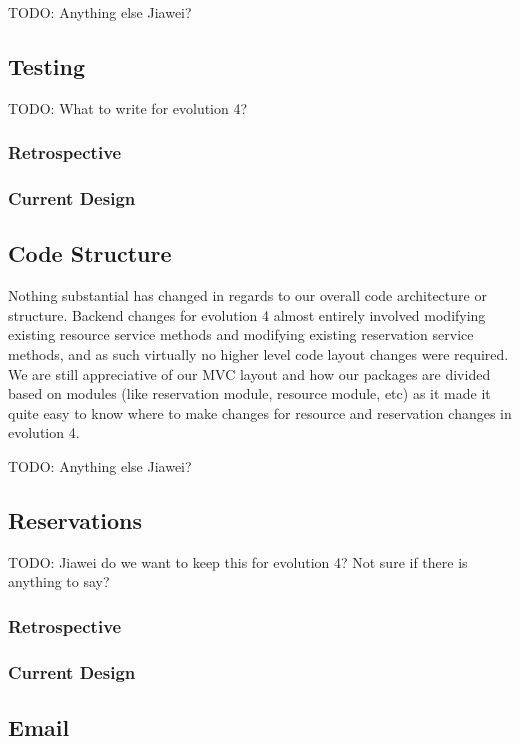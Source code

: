 \documentclass[12pt]{article}
\begin{document}
TODO: Anything else Jiawei? 


\subsection{Testing}

TODO: What to write for evolution 4? 

\subsubsection{Retrospective}


\subsubsection{Current Design}


\subsection{Code Structure}
Nothing substantial has changed in regards to our overall code architecture or structure. Backend changes for evolution 4 almost entirely involved modifying existing resource service methods and modifying existing reservation service methods, and as such virtually no higher level code layout changes were required. We are still appreciative of our MVC layout and how our packages are divided based on modules (like reservation module, resource module, etc) as it made it quite easy to know where to make changes for resource and reservation changes in evolution 4. 

TODO: Anything else Jiawei?


\subsection{Reservations}
TODO: Jiawei do we want to keep this for evolution 4?  Not sure if there is anything to say? 
\subsubsection{Retrospective}


\subsubsection{Current Design}


\subsection{Email}
\end{document}
